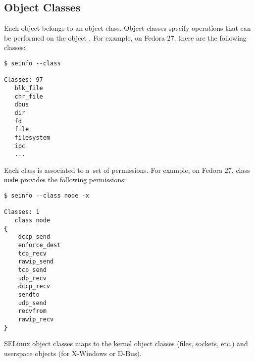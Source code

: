 \subsection{Object Classes}
Each object belongs to an object class. Object classes specify operations that
can be performed on the object \cite[pp.~29--30]{tsn}. For example, on Fedora
27, there are the following classes:
\begin{lstlisting}
$ seinfo --class

Classes: 97
   blk_file
   chr_file
   dbus
   dir
   fd
   file
   filesystem
   ipc
   ...
\end{lstlisting}

Each class is associated to a~set of permissions. For example, on Fedora 27,
class \texttt{node} provides the following permissions:
\begin{lstlisting}
$ seinfo --class node -x

Classes: 1
   class node
{
	dccp_send
	enforce_dest
	tcp_recv
	rawip_send
	tcp_send
	udp_recv
	dccp_recv
	sendto
	udp_send
	recvfrom
	rawip_recv
}
\end{lstlisting}
SELinux object classes maps to the kernel object classes (files, sockets, etc.)
and userspace objects (for X-Windows or D-Bus).

